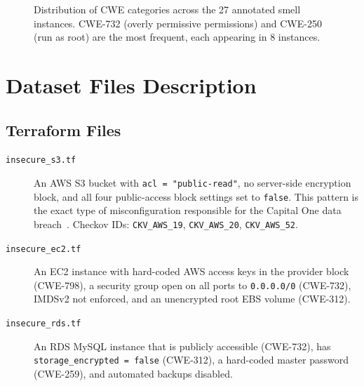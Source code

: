 \documentclass[12pt, a4paper]{report}
\begin{document}
\begin{figure}[H]
  \centering
  \caption{Distribution of CWE categories across the 27 annotated smell instances.
           CWE-732 (overly permissive permissions) and CWE-250 (run as root)
           are the most frequent, each appearing in 8 instances.}
  \label{fig:cwe_distribution}
\end{figure}

\section{Dataset Files Description}

\subsection{Terraform Files}

\begin{description}
  \item[\texttt{insecure\_s3.tf}] An AWS S3 bucket with \texttt{acl = "public-read"},
  no server-side encryption block, and all four public-access block settings set to
  \texttt{false}. This pattern is the exact type of misconfiguration responsible for
  the Capital One data breach~\citep{war2025detection}.
  Checkov IDs: \texttt{CKV\_AWS\_19}, \texttt{CKV\_AWS\_20}, \texttt{CKV\_AWS\_52}.

  \item[\texttt{insecure\_ec2.tf}] An EC2 instance with hard-coded AWS access keys in
  the provider block (CWE-798), a security group open on all ports to \texttt{0.0.0.0/0}
  (CWE-732), IMDSv2 not enforced, and an unencrypted root EBS volume (CWE-312).

  \item[\texttt{insecure\_rds.tf}] An RDS MySQL instance that is publicly accessible
  (CWE-732), has \texttt{storage\_encrypted = false} (CWE-312), a hard-coded master
  password (CWE-259), and automated backups disabled.
\end{description}
\end{document}
